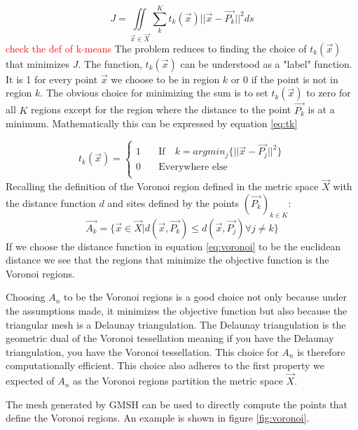 \begin{equation}
    J = \iint \limits_{\Vec{x}\in\Vec{X}}\sum_{k}^{K}t_k(\Vec{x})||\Vec{x}- \Vec{P_k}||^2ds
    \label{eq:objFunc}
\end{equation}
\textcolor{red}{check the def of k-means}
The problem reduces to finding the choice of $t_k(\Vec{x})$ that minimizes $J$. The function, $t_k(\Vec{x})$ can be understood as a "label" function. It is 1 for every point $\Vec{x}$ we choose to be in region $k$ or 0 if the point is not in region $k$. The obvious choice for minimizing the sum is to set $t_k(\Vec{x})$ to zero for all $K$ regions except for the region where the distance to the point $\Vec{P_k}$ is at a minimum. Mathematically this can be expressed by equation \ref{eq:tk}

\begin{equation}
    t_k(\Vec{x}) = 
    \begin{cases}
        1 & \quad \text{If} \quad k = argmin_j\{||\Vec{x} - \Vec{P_j}||^2\}  \\
        0 & \quad \text{Everywhere else} \\
    \end{cases}
    \label{eq:tk}
\end{equation}
Recalling the definition of the Voronoi region defined in the metric space $\Vec{X}$ with the distance function $d$ and sites defined by the points $(\Vec{P_k})_{k \in K} $: 
\begin{equation}
    \Vec{A_k} = \{\Vec{x} \in \Vec{X}|d(\Vec{x},\Vec{P_k}) \leq d(\Vec{x},\Vec{P_j})\forall  j \neq k \}
    \label{eq:voronoi}
\end{equation}
If we choose the distance function in equation \ref{eq:voronoi} to be the euclidean distance we see that the regions that minimize the objective function is the Voronoi regions. \par
Choosing $A_n$ to be the Voronoi regions is a good choice not only because under the assumptions made, it minimizes the objective function but also because the triangular mesh is a Delaunay triangulation. The Delaunay triangulation is the geometric dual of the Voronoi tessellation meaning if you have the Delaunay triangulation, you have the Voronoi tessellation. This choice for $A_n$ is therefore computationally efficient. This choice also adheres to the first property we expected of $A_n$ as the Voronoi regions partition the metric space $\Vec{X}$. \par
The mesh generated by GMSH can be used to directly compute the points that define the Voronoi regions. An example is shown in figure \ref{fig:voronoi}. 

